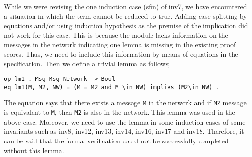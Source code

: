 \documentclass[a4paper,fleqn]{cas-dc}
\begin{document}
While we were revising the one induction case (sfin) of inv7, we have encountered a situation in which the term cannot be reduced to true. Adding case-splitting by equations and/or using induction hypothesis as the premise of the implication did not work for this case. This is because the module lacks information on the messages in the network indicating one lemma is missing in the existing proof scores. Thus, we need to include this information by means of equations in the specification.
Then we define a trivial lemma as follows; 
\begin{verbatim}
op lm1 : Msg Msg Network -> Bool
eq lm1(M, M2, NW) = (M = M2 and M \in NW) implies (M2\in NW) .
\end{verbatim}
The equation says that there exists a message \verb!M! in the network and if \verb!M2! message is equivalent to \verb!M!, then \verb!M2! is also in the network. This lemma was used in the above case. Moreover, we need to use the lemma in some induction cases of some invariants such as inv8, inv12, inv13, inv14, inv16, inv17 and inv18. Therefore, it can be said that the formal verification could not be successfully completed without this lemma.

\end{document}
